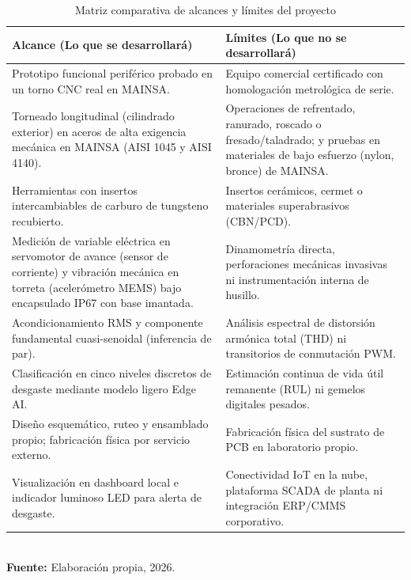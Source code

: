 {\small
{}
\setlength{\parskip}{1.5pt}
\begin{table}[H]
\centering
\caption{Matriz comparativa de alcances y límites del proyecto}\label{tab:alcance_limites}
\begin{tabular}{|>{\raggedright\arraybackslash}p{6.8cm}|>{\raggedright\arraybackslash}p{7.2cm}|}
\hline
\textbf{Alcance (Lo que se desarrollará)} & \textbf{Límites (Lo que no se desarrollará)} \\ \hline 
Prototipo funcional periférico probado en un torno CNC real en MAINSA. & Equipo comercial certificado con homologación metrológica de serie. \\ \hline
Torneado longitudinal (cilindrado exterior) en aceros de alta exigencia mecánica en MAINSA (AISI 1045 y AISI 4140). & Operaciones de refrentado, ranurado, roscado o fresado/taladrado; y pruebas en materiales de bajo esfuerzo (nylon, bronce) de MAINSA. \\ \hline
Herramientas con insertos intercambiables de carburo de tungsteno recubierto. & Insertos cerámicos, cermet o materiales superabrasivos (CBN/PCD). \\ \hline
Medición de variable eléctrica en servomotor de avance (sensor de corriente) y vibración mecánica en torreta (acelerómetro MEMS) bajo encapsulado IP67 con base imantada. & Dinamometría directa, perforaciones mecánicas invasivas ni instrumentación interna de husillo. \\ \hline
Acondicionamiento RMS y componente fundamental cuasi-senoidal (inferencia de par). & Análisis espectral de distorsión armónica total (THD) ni transitorios de conmutación PWM. \\ \hline
Clasificación en cinco niveles discretos de desgaste mediante modelo ligero Edge AI. & Estimación continua de vida útil remanente (RUL) ni gemelos digitales pesados. \\ \hline
Diseño esquemático, ruteo y ensamblado propio; fabricación física por servicio externo. & Fabricación física del sustrato de PCB en laboratorio propio. \\ \hline
Visualización en dashboard local e indicador luminoso LED para alerta de desgaste. & Conectividad IoT en la nube, plataforma SCADA de planta ni integración ERP/CMMS corporativo. \\ \hline
\end{tabular}
\\[2pt]
{\footnotesize \textbf{Fuente:} Elaboración propia, 2026.}
\end{table}
}
